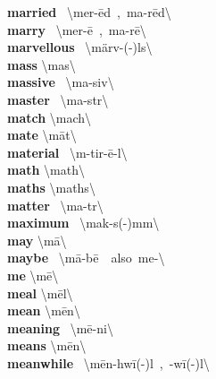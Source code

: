 \documentclass[10pt,a4paper]{article}
\begin{document}
\begin{multicols}{2}
\textbf{ married }\quad \ \textbackslash \textprimstress mer-\={e}d\ ,\ \textprimstress ma-r\={e}d\textbackslash \\
\textbf{ marry }\quad \ \textbackslash \textprimstress mer-\={e}\ ,\ \textprimstress ma-r\={e}\textbackslash \\
\textbf{ marvellous }\quad \ \textbackslash \textprimstress m\"{a}rv-(\textschwa -)l\textschwa s\textbackslash \\
\textbf{ mass }\quad \textbackslash \textprimstress mas\textbackslash \\
\textbf{ massive }\quad \ \textbackslash \textprimstress ma-siv\textbackslash \\
\textbf{ master }\quad \ \textbackslash \textprimstress ma-st\textschwa r\textbackslash \\
\textbf{ match }\quad \textbackslash \textprimstress mach\textbackslash \\
\textbf{ mate }\quad \textbackslash \textprimstress m\={a}t\textbackslash \\
\textbf{ material }\quad \ \textbackslash m\textschwa -\textprimstress tir-\={e}-\textschwa l\textbackslash \\
\textbf{ math }\quad \textbackslash \textprimstress math\textbackslash \\
\textbf{ maths }\quad \textbackslash \textprimstress maths\textbackslash \\
\textbf{ matter }\quad \ \textbackslash \textprimstress ma-t\textschwa r\textbackslash \\
\textbf{ maximum }\quad \ \textbackslash \textprimstress mak-s(\textschwa -)m\textschwa m\textbackslash \\
\textbf{ may }\quad \textbackslash \textprimstress m\={a}\textbackslash \\
\textbf{ maybe }\quad \ \textbackslash \textprimstress m\={a}-b\={e}\ \ also\ \textprimstress me-\textbackslash \\
\textbf{ me }\quad \textbackslash \textprimstress m\={e}\textbackslash \\
\textbf{ meal }\quad \textbackslash \textprimstress m\={e}l\textbackslash \\
\textbf{ mean }\quad \textbackslash \textprimstress m\={e}n\textbackslash \\
\textbf{ meaning }\quad \ \textbackslash \textprimstress m\={e}-ni\engma \textbackslash \\
\textbf{ means }\quad \textbackslash \textprimstress m\={e}n\textbackslash \\
\textbf{ meanwhile }\quad \ \textbackslash \textprimstress m\={e}n-\textsecstress hw\={i}(-\textschwa )l\ ,\ -\textsecstress w\={i}(-\textschwa )l\textbackslash \\

\end{multicols}
\end{document}
